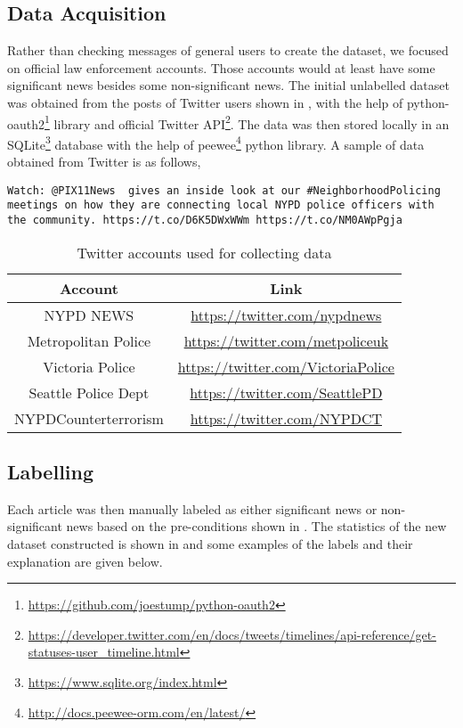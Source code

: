\subsection{Data Acquisition}
Rather than checking messages of general users to create the dataset, we focused on official law enforcement accounts. Those accounts would at least have some significant news besides some non-significant news.
The initial unlabelled dataset was obtained from the posts of Twitter users shown in , with the help of python-oauth2\footnote{\url{https://github.com/joestump/python-oauth2}} library and official Twitter API\footnote{\url{https://developer.twitter.com/en/docs/tweets/timelines/api-reference/get-statuses-user_timeline.html}}. The data was then stored locally in an SQLite\footnote{\url{https://www.sqlite.org/index.html}} database with the help of peewee\footnote{\url{http://docs.peewee-orm.com/en/latest/}} python library. A sample of data obtained from Twitter is as follows,

\begin{verbatim}
Watch: @PIX11News  gives an inside look at our #NeighborhoodPolicing
meetings on how they are connecting local NYPD police officers with
the community. https://t.co/D6K5DWxWWm https://t.co/NM0AWpPgja
\end{verbatim}

\begin{table}
    \centering
    \caption{Twitter accounts used for collecting data}
    \label{tbl:twitter_users}
    \begin{tabular}{c|c}
    \toprule
    Account & Link \\
    \midrule
    NYPD NEWS & \url{https://twitter.com/nypdnews} \\
    Metropolitan Police & \url{https://twitter.com/metpoliceuk} \\
    Victoria Police & \url{https://twitter.com/VictoriaPolice} \\
    Seattle Police Dept & \url{https://twitter.com/SeattlePD} \\
    NYPDCounterterrorism & \url{https://twitter.com/NYPDCT} \\
    \bottomrule
    \end{tabular}
\end{table}


\subsection{Labelling}
Each article was then manually labeled as either significant news or non-significant news based on the pre-conditions shown in . The statistics of the new dataset constructed is shown in   and some examples of the labels and their explanation are given below.

